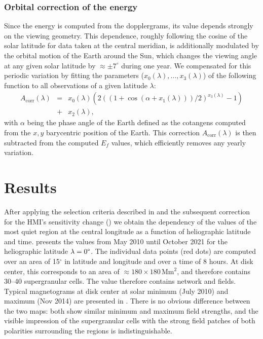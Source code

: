 \documentclass{aa}
\begin{document}
\subsubsection*{Orbital correction of the \fff 
energy}

Since the \fff 
energy
is computed from the \los{} dopplergrams, its value depends strongly on the viewing geometry. This dependence,  roughly following the cosine of the solar latitude for data taken at the central meridian, is additionally modulated by the orbital motion of the Earth around the Sun, which changes the viewing angle at any given solar latitude by $\approx\pm7^\circ$ during one year. We compensated for this periodic variation by fitting the parameters ($x_0(\lambda), ..., x_3(\lambda)$) of the following function to all observations of a given latitude $\lambda$:
\begin{eqnarray}
\label{eq:orbitcorr}
A_{\mbox{corr}}(\lambda) &=& x_0(\lambda) (  2 ( (1+\cos(\alpha+x_1(\lambda)))/2)^{x_3(\lambda)}-1   )\nonumber \\
&+&x_2(\lambda),
\end{eqnarray}
with $\alpha$ being the phase angle of the Earth defined as the cotangens computed from the $x,y$ barycentric position of the Earth.
This correction $A_{\mbox{corr}}(\lambda)$ is then subtracted from the computed 
$E_f$ values, which efficiently removes any yearly variation. 

\section{Results}\label{results}

After applying the selection criteria described in  and the subsequent correction for the 
HMI's
sensitivity change () we obtain the dependency of the \brms{} values of the most quiet region at the central longitude as a function of heliographic latitude and time.  presents the \brms{} values from May 2010 until October 2021 for the heliographic latitude $\lambda = 0\degree$. The individual data points (red dots) are computed over an area of 15$^\circ$ in latitude and longitude and over a time of 8 hours. At disk center, this corresponds to an area of $\approx 180 \times 180$\,Mm$^2$, and therefore contains 30--40 supergranular cells. The \brms{} value 
therefore contains
network and \IN{} fields.
Typical magnetograms at disk center at solar minimum (July 2010) and maximum (Nov 2014) are presented in . There is no obvious difference between the two maps: both show similar minimum and maximum field strengths, and the visible impression of the supergranular cells with the strong field patches of both polarities surrounding the \IN{} regions is indistinguishable.
\end{document}
